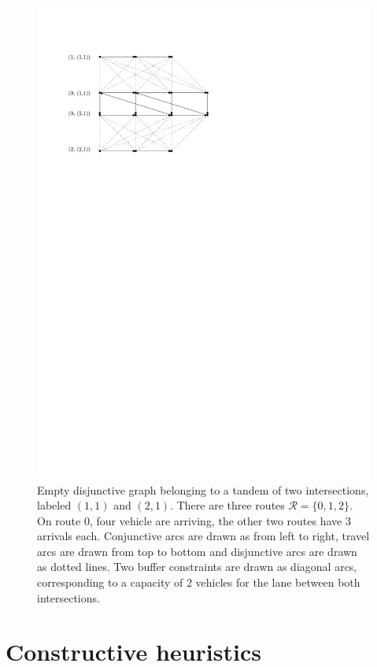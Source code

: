 \documentclass[a4paper]{article}
\theoremstyle{definition}
\theoremstyle{plain}
\begin{document}
\begin{figure}
  \centering
  \includegraphics[scale=1]{figures/network/disjunctive_graph}
  \caption{Empty disjunctive graph belonging to a tandem of two intersections,
    labeled $(1, 1)$ and $(2, 1)$. There are three routes
    $\mathcal{R} = \{0, 1, 2\}$. On route 0, four vehicle are arriving, the
    other two routes have 3 arrivals each. Conjunctive arcs are drawn as from
    left to right, travel arcs are drawn from top to bottom and disjunctive arcs
    are drawn as dotted lines. Two buffer constraints are drawn as diagonal
    arcs, corresponding to a capacity of 2 vehicles for the lane between both
    intersections.}
\end{figure}

\section{Constructive heuristics}
\end{document}
